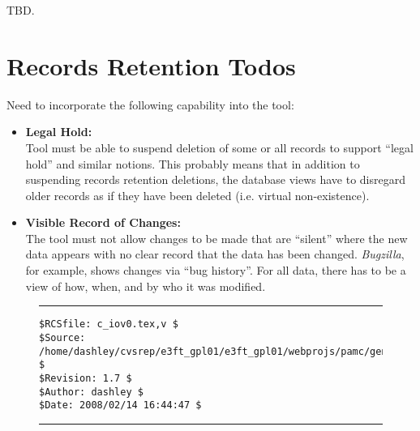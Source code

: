 TBD.


\section{Records Retention Todos}
\label{ciov0:srrt0}

Need to incorporate the following capability into the tool:

\begin{itemize}
\item \textbf{Legal Hold:}\\
      Tool must be able to suspend deletion of some or all records
      to support ``legal hold'' and similar notions.  This probably
      means that in addition to suspending records retention deletions,
      the database views have to disregard older records as if they have been
      deleted (i.e. virtual non-existence).
\item \textbf{Visible Record of Changes:}\\
      The tool must not allow changes to be made that are ``silent'' where
      the new data appears with no clear record that the data has been changed.
      \emph{Bugzilla}, for example, shows changes via ``bug history''.  For all data,
      there has to be a view of how, when, and by who it was modified.
\end{itemize}



\noindent\begin{figure}[!b]
\noindent\rule[-0.25in]{\textwidth}{1pt}
\begin{tiny}
\begin{verbatim}
$RCSfile: c_iov0.tex,v $
$Source: /home/dashley/cvsrep/e3ft_gpl01/e3ft_gpl01/webprojs/pamc/gen_a/docs/manual/man_a/c_iov0/c_iov0.tex,v $
$Revision: 1.7 $
$Author: dashley $
$Date: 2008/02/14 16:44:47 $
\end{verbatim}
\end{tiny}
\noindent\rule[0.25in]{\textwidth}{1pt}
\end{figure}

%
%
%
%
%
%
%
